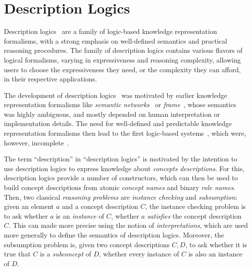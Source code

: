 
\section{Description Logics}
\label{sec:repr-knowl-using}

Description logics~\cite{DLhandbook} are a family of logic-based knowledge representation
formalisms, with a strong emphasis on well-defined semantics and practical reasoning
procedures.  The family of description logics contains various flavors of logical
formalisms, varying in expressiveness and reasoning complexity, allowing users to choose
the expressiveness they need, or the complexity they can afford, in their respective
applications.

The development of description logics~\cite{baader01overview} was motivated by earlier
knowledge representation formalisms like \emph{semantic networks}~\cite{SemanticNetworks}
or \emph{frame}~\cite{Minsky-Frames}, whose semantics was highly ambiguous, and mostly
depended on human interpretation or implementation details.  The need for well-defined and
predictable knowledge representation formalisms then lead to the first logic-based
systems~\cite{journals/cogsci/BrachmanS85}, which were, however,
incomplete~\cite{conf/kr/Schmidt-Schauss89}.

The term \enquote{description} in \enquote{description logics} is motivated by the
intention to use description logics to express knowledge about \emph{concepts
  descriptions}.  For this, description logics provide a number of constructors, which can
then be used to build concept descriptions from atomic \emph{concept names} and binary
\emph{role names}.  Then, two classical \emph{reasoning problems} are \emph{instance
  checking} and \emph{subsumption}: given an element $a$ and a concept description $C$,
the instance checking problem is to ask whether $a$ is an \emph{instance} of $C$, \ie
whether $a$ \emph{satisfies} the concept description $C$.  This can made more precise
using the notion of \emph{interpretations}, which are used more generally to define the
semantics of description logics.  Moreover, the subsumption problem is, given two concept
descriptions $C, D$, to ask whether it is true that $C$ is a \emph{subconcept} of $D$, \ie
whether every instance of $C$ is also an instance of $D$.

